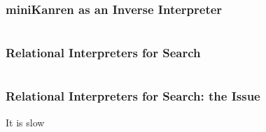 \documentclass[xcolor=table, aspectratio=169]{beamer}
\begin{document}
\begin{frame}[fragile]
  \frametitle{miniKanren as an Inverse Interpreter}
  \begin{columns}[t]
    \begin{column}{0.49\textwidth}
      
   \end{column}
    \begin{column}{0.49\textwidth}
      
      

      \vspace{0.5cm}

    
      
      
    \end{column}
  \end{columns}
\end{frame}

\begin{frame}[fragile]
  \frametitle{Relational Interpreters for Search}

\begin{columns}
  \begin{column}{0.49\textwidth}
    
  \end{column}

  \begin{column}{0.49\textwidth}
    
  \end{column}
\end{columns}

 
\end{frame}

\begin{frame}[fragile]
  \frametitle{Relational Interpreters for Search: the Issue}
\begin{center}
  It is slow
\end{center}

\vspace{0.5cm}

\end{frame}
\end{document}
